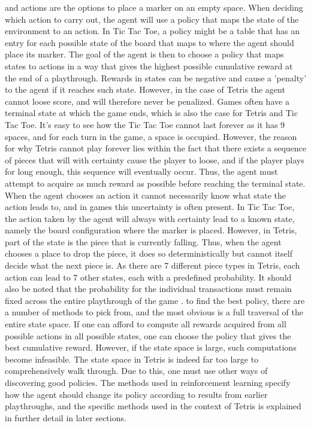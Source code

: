 and actions are the options to place a marker
on an empty space.
When deciding which action to carry out, the agent will use
a policy that maps the state of the environment to an action.
In Tic Tac Toe, a policy might be a table that has an entry for each possible
state of the board that maps to where the agent should place its marker.
The goal of the agent is then to choose a policy that maps states to actions 
in a way that
gives the highest possible cumulative reward at the end of a playthrough. 
Rewards in states can be negative and cause a 'penalty' to the agent if it reaches
such state. However, in the case of Tetris the agent cannot loose score,
and will therefore never be penalized.
Games often have a terminal state at which the game ends, which is 
also the case for Tetris and Tic Tac Toe. It's easy to see how the
Tic Tac Toe cannot last forever as it has 9 spaces, and for each turn in the game,
a space is occupied. However, the reason for why Tetris cannot play forever
lies within the fact that there exists a sequence of pieces that will
with certainty cause the player to loose, and if the player plays for 
long enough, this sequence will eventually occur. Thus, the agent must
attempt to acquire as much reward as possible before reaching the terminal 
state. 
When the agent chooses an action it cannot necessarily know what state
the action leads to, and in games this uncertainty is often present.
In Tic Tac Toe, the action taken by the agent will always with certainty 
lead to a known state, namely the board configuration where the marker is placed.
However, in Tetris, part of the state is the piece that is currently falling.
Thus, when the agent chooses a place to drop the piece, it does so deterministically
but cannot itself decide what the next piece is. As there are 7 different piece
types in Tetris, each action can lead to 7 other states, each with a predefined probability.
It should also be noted that the probability for the individual transactions
must remain fixed across the entire playthrough of the game \citep{Carr}.
to find the best policy, there are a number of methods to pick from,
and the most obvious is a full traversal of the entire state space.
If one can afford to compute all rewards acquired from all possible 
actions in all possible states, one can choose the policy 
that gives the best cumulative reward. However, if the state space is
large, such computations become infeasible. The state space in Tetris
is indeed far too large to comprehensively walk through.
Due to this, one must use other ways of discovering good policies.
The methods used in reinforcement learning 
specify how the agent should change its policy according to 
results from earlier playthroughs, and the specific methods used in
the context of Tetris is explained in further detail in later sections.


